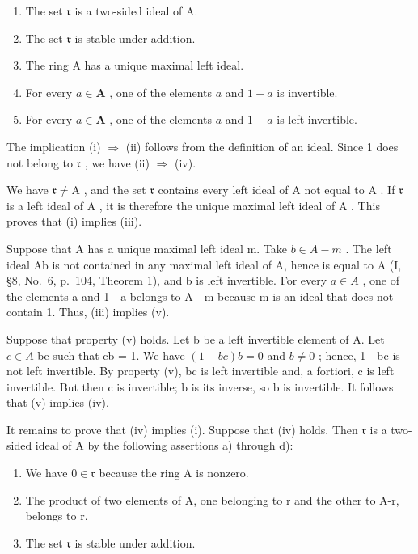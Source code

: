 \begin{enumerate}
\def\labelenumi{(\roman{enumi})}
\item
  The set \(\mathfrak{r}\) is a two-sided ideal of A.
\item
  The set \(\mathfrak{r}\) is stable under addition.
\item
  The ring A has a unique maximal left ideal.
\item
  For every \(a \in \mathbf{A}\) , one of the elements \(a\) and \(1 - a\) is invertible.
\item
  For every \(a \in \mathbf{A}\) , one of the elements \(a\) and \(1 - a\) is left invertible.
\end{enumerate}

The implication (i) \(\Rightarrow\) (ii) follows from the definition of an ideal. Since 1 does not belong to \(\mathfrak{r}\) , we have (ii) \(\Rightarrow\) (iv).

We have \(\mathfrak{r} \neq \mathrm{A}\) , and the set \(\mathfrak{r}\) contains every left ideal of \(\mathrm{A}\) not equal to \(\mathrm{A}\) . If \(\mathfrak{r}\) is a left ideal of \(\mathrm{A}\) , it is therefore the unique maximal left ideal of \(\mathrm{A}\) . This proves that (i) implies (iii).

Suppose that A has a unique maximal left ideal m. Take \(b \in A - m\) . The left ideal Ab is not contained in any maximal left ideal of A, hence is equal to A (I, §8, No.~6, p.~104, Theorem 1), and b is left invertible. For every \(a \in A\) , one of the elements a and 1 - a belongs to A - m because m is an ideal that does not contain 1. Thus, (iii) implies (v).

Suppose that property (v) holds. Let b be a left invertible element of A. Let \(c \in A\) be such that cb = 1. We have \((1 - bc)b = 0\) and \(b \neq 0\) ; hence, 1 - bc is not left invertible. By property (v), bc is left invertible and, a fortiori, c is left invertible. But then c is invertible; b is its inverse, so b is invertible. It follows that (v) implies (iv).

It remains to prove that (iv) implies (i). Suppose that (iv) holds. Then \(\mathfrak{r}\) is a two-sided ideal of A by the following assertions a) through d):

\begin{enumerate}
\def\labelenumi{\alph{enumi})}
\item
  We have \(0 \in \mathfrak{r}\) because the ring A is nonzero.
\item
  The product of two elements of A, one belonging to r and the other to A-r, belongs to r.
\item
  The set \(\mathfrak{r}\) is stable under addition.
\end{enumerate}

